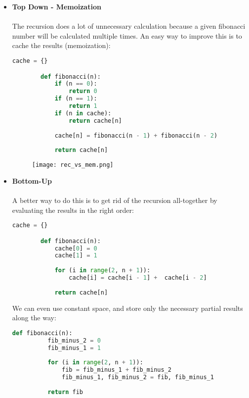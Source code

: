 \documentclass[12pt]{article}
\begin{document}
	\begin{itemize}
		\item \textbf{Top Down - Memoization} \\\\ The recursion does a lot of unnecessary calculation because a given fibonacci number will be calculated multiple times. An easy way to improve this is to cache the results (memoization):
		
		\begin{lstlisting}[language=Python]
        cache = {}

        def fibonacci(n):
            if (n == 0):
                return 0
            if (n == 1):
                return 1
            if (n in cache):
                return cache[n]
        
            cache[n] = fibonacci(n - 1) + fibonacci(n - 2)
        
            return cache[n]
        \end{lstlisting}
        
	\begin{figure}[h!]
        	\centering
        	\texttt{[image: rec\_vs\_mem.png]}
        	\label{fig:recursive_vs_memoization}
        \end{figure}
        
        
		\item \textbf{Bottom-Up} \\\\ A better way to do this is to get rid of the recursion all-together by evaluating the results in the right order:
		
		\begin{lstlisting}[language=Python]
        cache = {}

        def fibonacci(n):
            cache[0] = 0
            cache[1] = 1
        
            for (i in range(2, n + 1)):
                cache[i] = cache[i - 1] +  cache[i - 2]
        
            return cache[n]
        \end{lstlisting}
        We can even use constant space, and store only the necessary partial results along the way:
        
		\begin{lstlisting}[language=Python]
        def fibonacci(n):
          fib_minus_2 = 0
          fib_minus_1 = 1
        
          for (i in range(2, n + 1)):
              fib = fib_minus_1 + fib_minus_2
              fib_minus_1, fib_minus_2 = fib, fib_minus_1
        
          return fib
        \end{lstlisting}
		
	\end{itemize}
	
\end{document}

